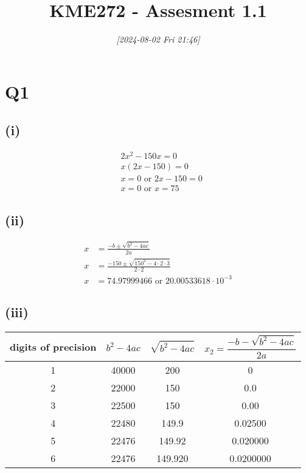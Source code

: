 \documentclass[11pt]{article}
\date{\textit{{[}2024-08-02 Fri 21:46]}}
\title{KME272 - Assesment 1.1}
\begin{document}
\maketitle
\tableofcontents

\section{Q1}
\label{sec:org22684f8}
\subsection{(i)}
\label{sec:org9c183ce}
\begin{align*}
& 2x^2-150x =0 \\
& x(2x-150) =0 \\
& x =0 \textrm{ or } 2x-150=0 \\
& x =0 \textrm{ or } x=75
\end{align*}
\subsection{(ii)}
\label{sec:orgd82bf82}
\begin{align*}
x&=\frac{-b \pm \sqrt{b^2-4ac}}{2a} \\
x&=\frac{-150 \pm \sqrt{150^2-4\cdot 2\cdot 3}}{2\cdot 2} \\
x&=74.979 994 66 \textrm{ or } 20.005 336 18 \cdot 10^{−3}
\end{align*}
\subsection{(iii)}
\label{sec:org1cfa61e}
\begin{center}
\begin{tabular}{ |c|c|c|c| }
\hline
 digits of precision & \[b^2-4ac\] & \[\sqrt{b^2-4ac}\] & \[x_2=\frac{-b-\sqrt{b^2-4ac}}{2a}\] \\ \hline
1                    & 40000       & 200                & 0                                    \\ \hline
2                    & 22000       & 150                & 0.0                                  \\ \hline
3                    & 22500       & 150                & 0.00                                 \\ \hline
4                    & 22480       & 149.9              & 0.02500                              \\ \hline
5                    & 22476       & 149.92             & 0.020000                             \\ \hline
6                    & 22476       & 149.920            & 0.0200000                            \\ \hline
\end{tabular}
\end{center}
\end{document}
